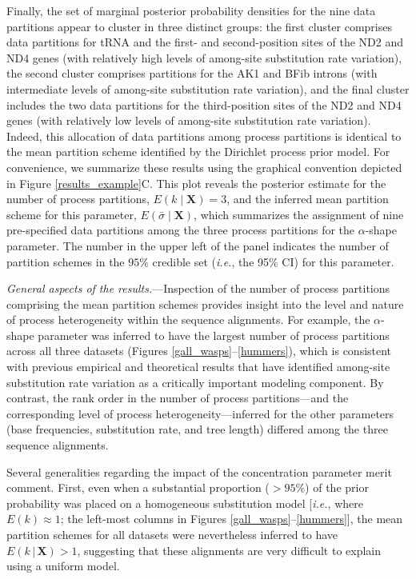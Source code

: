\documentclass[11pt]{article}
\newcommand{\given}{\ensuremath{\,|\,}}
\begin{document}
Finally, the set of marginal posterior probability densities for the nine data partitions appear to cluster in three distinct groups: the first cluster comprises data partitions for tRNA and the first- and second-position sites of the ND2 and ND4 genes (with relatively high levels of among-site substitution rate variation), the 
second cluster comprises partitions for the AK1 and BFib introns (with intermediate levels of among-site substitution rate variation), and the final cluster includes the two data partitions for the third-position sites of the ND2 and ND4 genes (with relatively low levels of among-site substitution rate variation).  
Indeed, this allocation of data partitions among process partitions is identical to the mean partition scheme identified by the Dirichlet process prior model.  
For convenience, we summarize these results using the graphical convention depicted in Figure \ref{results_example}C.  
This plot reveals the posterior estimate for the number of process partitions, $E(k \mid \mathbf{X}) = 3$, and the inferred mean partition scheme for this parameter, $E(\bar{\sigma} \mid \mathbf{X})$, which summarizes the assignment of nine pre-specified data partitions among the three process partitions for 
the $\alpha$-shape parameter.  
The number in the upper left of the panel indicates the number of partition schemes in the $95\%$ credible set ({\it i.e.}, the 95\% CI) for this parameter.

\bigskip
\noindent
{\it General aspects of the results.}---Inspection of the number of process partitions comprising the mean partition schemes provides insight into the level and nature of process heterogeneity within the sequence alignments.  
For example, the $\alpha$-shape parameter was inferred to have the largest number of process partitions across all three datasets (Figures \ref{gall_wasps}--\ref{hummers}), which is consistent with previous empirical \citep[{\it e.g.},][]{nylander04} and theoretical \citep[{\it e.g.},][]{yang96a,huelsenbeck04b} results that have identified among-site substitution rate variation 
as a critically important modeling component.  
By contrast, the rank order in the number of process partitions---and the corresponding level of process heterogeneity---inferred for the other parameters (base frequencies, 
substitution rate, and tree length) differed among the three sequence alignments. 

Several generalities regarding the impact of the concentration parameter merit comment.  
First, even when a substantial proportion ($>95\%$) of the prior probability was placed on a homogeneous substitution model [{\it i.e.}, where $E(k) \approx 1$; the left-most columns in Figures \ref{gall_wasps}--\ref{hummers}], the mean partition schemes for all datasets were nevertheless inferred to have $E(k \given \mathbf{X}) > 1$, suggesting that these alignments are very difficult to explain using a uniform model.
\end{document}
